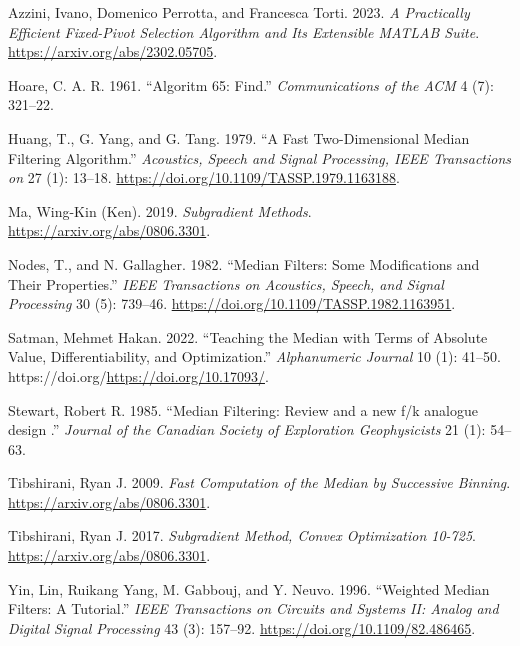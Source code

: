 \documentclass[
  11pt,
  a4paper,
]{article}
\newlength{\cslhangindent}
\newenvironment{CSLReferences}[2] %
 {\begin{list}{}{%
  \setlength{\itemindent}{0pt}
  \setlength{\leftmargin}{0pt}
  \setlength{\parsep}{0pt}
  \ifodd #1
   \setlength{\leftmargin}{\cslhangindent}
   \setlength{\itemindent}{-1\cslhangindent}
  \fi
  \setlength{\itemsep}{#2\baselineskip}}}
 {\end{list}}
\begin{document}
\protect{}\label{refs}
\begin{CSLReferences}{1}{1}
Azzini, Ivano, Domenico Perrotta, and Francesca Torti. 2023. \emph{A
Practically Efficient Fixed-Pivot Selection Algorithm and Its Extensible
MATLAB Suite}. \url{https://arxiv.org/abs/2302.05705}.

Hoare, C. A. R. 1961. {``Algoritm 65: Find.''} \emph{Communications of
the ACM} 4 (7): 321--22.

Huang, T., G. Yang, and G. Tang. 1979. {``A Fast Two-Dimensional Median
Filtering Algorithm.''} \emph{Acoustics, Speech and Signal Processing,
IEEE Transactions on} 27 (1): 13--18.
\url{https://doi.org/10.1109/TASSP.1979.1163188}.

Ma, Wing-Kin (Ken). 2019. \emph{Subgradient Methods}.
\url{https://arxiv.org/abs/0806.3301}.

Nodes, T., and N. Gallagher. 1982. {``Median Filters: Some Modifications
and Their Properties.''} \emph{IEEE Transactions on Acoustics, Speech,
and Signal Processing} 30 (5): 739--46.
\url{https://doi.org/10.1109/TASSP.1982.1163951}.

Satman, Mehmet Hakan. 2022. {``{Teaching the Median with Terms of
Absolute Value, Differentiability, and Optimization}.''}
\emph{Alphanumeric Journal} 10 (1): 41--50.
https://doi.org/\url{https://doi.org/10.17093/}.

Stewart, Robert R. 1985. {``{Median Filtering: Review and a new f/k
analogue design }.''} \emph{Journal of the Canadian Society of
Exploration Geophysicists} 21 (1): 54--63.

Tibshirani, Ryan J. 2009. \emph{Fast Computation of the Median by
Successive Binning}. \url{https://arxiv.org/abs/0806.3301}.

Tibshirani, Ryan J. 2017. \emph{Subgradient Method, Convex Optimization
10-725}. \url{https://arxiv.org/abs/0806.3301}.

Yin, Lin, Ruikang Yang, M. Gabbouj, and Y. Neuvo. 1996. {``Weighted
Median Filters: A Tutorial.''} \emph{IEEE Transactions on Circuits and
Systems II: Analog and Digital Signal Processing} 43 (3): 157--92.
\url{https://doi.org/10.1109/82.486465}.

\end{CSLReferences}
\end{document}
